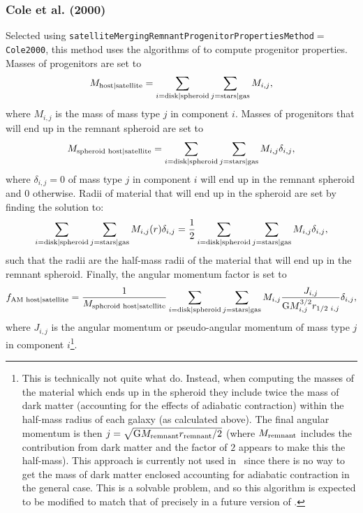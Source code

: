 \subsubsection{Cole et al. (2000)}

Selected using {\tt satelliteMergingRemnantProgenitorPropertiesMethod}$=${\tt Cole2000}, this method uses the algorithms of \cite{cole_hierarchical_2000} to compute progenitor properties. Masses of progenitors are set to
\begin{equation}
 M_{\rm host|satellite} = \sum_{i={\rm disk|spheroid}} \sum_{j={\rm stars|gas}} M_{i,j},
\end{equation}
where $M_{i,j}$ is the mass of mass type $j$ in \gls{component} $i$. Masses of progenitors that will end up in the remnant spheroid are set to
\begin{equation}
 M_{\rm spheroid\,\,host|satellite} = \sum_{i={\rm disk|spheroid}} \sum_{j={\rm stars|gas}} M_{i,j} \delta_{i,j},
\end{equation}
where $\delta_{i,j}=0$ of mass type $j$ in \gls{component} $i$ will end up in the remnant spheroid and $0$ otherwise. Radii of material that will end up in the spheroid are set by finding the solution to:
\begin{equation}
\sum_{i={\rm disk|spheroid}} \sum_{j={\rm stars|gas}} M_{i,j}(r) \delta_{i,j} = {1 \over 2} \sum_{i={\rm disk|spheroid}} \sum_{j={\rm stars|gas}} M_{i,j} \delta_{i,j},
\end{equation}
such that the radii are the half-mass radii of the material that will end up in the remnant spheroid. Finally, the angular momentum factor is set to
\begin{equation}
 f_{\rm AM\,\,host|satellite} = {1 \over M_{\rm spheroid\,\,host|satellite}} \sum_{i={\rm disk|spheroid}} \sum_{j={\rm stars|gas}} M_{i,j} {J_{i,j} \over {\rm G} M^{3/2}_{i,j} r_{1/2\,\,i,j}} \delta_{i,j},
\end{equation}
where $J_{i,j}$ is the angular momentum or pseudo-angular momentum of mass type $j$ in \gls{component} $i$\footnote{This is technically not quite what \protect\cite{cole_hierarchical_2000} do. Instead, when computing the masses of the material which ends up in the spheroid they include twice the mass of dark matter (accounting for the effects of adiabatic contraction) within the half-mass radius of each galaxy (as calculated above). The final angular momentum is then $j=\sqrt{{\rm G} M_{\rm remnant} r_{\rm remnant}/2}$ (where $M_{\rm remnant}$ includes the contribution from dark matter and the factor of $2$ appears to make this the half-mass). This approach is currently not used in \protect\glc\ since there is no way to get the mass of dark matter enclosed accounting for adiabatic contraction in the general case. This is a solvable problem, and so this algorithm is expected to be modified to match that of \protect\cite{cole_hierarchical_2000} precisely in a future version of \protect\glc.}.

